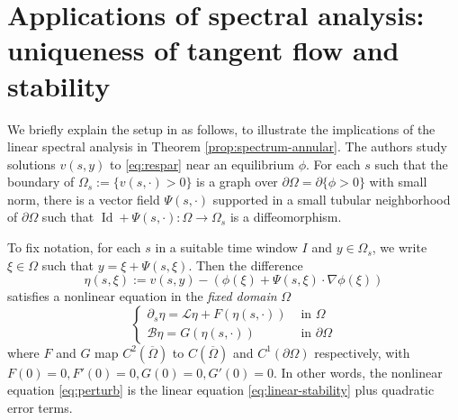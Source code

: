 \documentclass[11pt]{article}
\numberwithin{equation}{section}
\theoremstyle{definition}
\DeclareMathOperator{\dist}{dist}
\DeclareMathOperator{\Graph}{Graph}
\begin{document}
\section{Applications of spectral analysis: uniqueness of tangent flow and stability}\label{sec:spectrum-applications}

We briefly explain the setup in \cite{stability} as follows, to illustrate the implications of the linear spectral analysis in Theorem \ref{prop:spectrum-annular}. The authors study solutions $v(s,y)$ to \eqref{eq:respar} near an equilibrium $\phi$.
For each $s$ such that the boundary of $\Omega_s:= \{v(s,\cdot)>0 \}$ is a graph over $\partial\Omega=\partial\{\phi>0\}$ with small norm, there is a vector field $\Psi(s,\cdot)$ supported in a small tubular neighborhood of $\partial\Omega$ such that $\operatorname{Id} + \Psi(s,\cdot): \Omega \to \Omega_s$ is a diffeomorphism. %


To fix notation, for each $s$ in a suitable time window $I$ and $y\in \Omega_s$, we write $\xi\in \Omega$ such that $y=\xi + \Psi(s,\xi)$. Then the difference
\begin{equation}\label{def:perturb-domain-transf}
    \eta(s,\xi) := v(s,y) - \left( \phi(\xi) + \Psi(s,\xi) \cdot \nabla \phi(\xi) \right) 
\end{equation} 
satisfies a nonlinear equation in the \emph{fixed domain} $\Omega$
\begin{equation}\label{eq:perturb}
    \left\{\begin{array}{ll}
    \partial_s \eta = \mathscr{L} \eta + F(\eta(s,\cdot)) & \text{ in } \Omega \\
    \mathscr{B} \eta = G(\eta(s,\cdot)) &  \text{ in } \partial\Omega
\end{array} \right. 
\end{equation}
where $F$ and $G$ map $C^2(\overline{\Omega})$ to $C(\overline{\Omega})$ and $C^1(\partial\Omega)$ respectively, with $F(0)=0, F'(0)=0, G(0)=0, G'(0)=0$. In other words, the nonlinear equation \eqref{eq:perturb} is the linear equation \eqref{eq:linear-stability} plus quadratic error terms.
\end{document}
